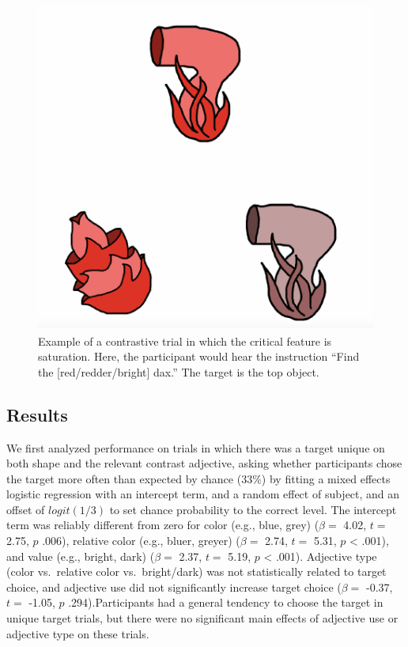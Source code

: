\documentclass[10pt, letterpaper]{article}
\newenvironment{CodeChunk}{}{}
\begin{document}
\begin{CodeChunk}
\begin{figure}[H]

{\centering \includegraphics{figs/brightdarktrial-1} 

}

\caption[Example of a contrastive trial in which the critical feature is saturation]{Example of a contrastive trial in which the critical feature is saturation. Here, the participant would hear the instruction ``Find the [red/redder/bright] dax.'' The target is the top object.}\label{fig:brightdarktrial}
\end{figure}
\end{CodeChunk}

\subsection{Results}\label{results-1}

We first analyzed performance on trials in which there was a target
unique on both shape and the relevant contrast adjective, asking whether
participants chose the target more often than expected by chance
(\(33\%\)) by fitting a mixed effects logistic regression with an
intercept term, and a random effect of subject, and an offset of
\(logit(1/3)\) to set chance probability to the correct level. The
intercept term was reliably different from zero for color (e.g., blue,
grey) (\(\beta =\) 4.02, \(t =\) 2.75, \(p\) .006), relative color
(e.g., bluer, greyer) (\(\beta =\) 2.74, \(t =\) 5.31, \(p\) \textless{}
.001), and value (e.g., bright, dark) (\(\beta =\) 2.37, \(t =\) 5.19,
\(p\) \textless{} .001). Adjective type (color vs.~relative color
vs.~bright/dark) was not statistically related to target choice, and
adjective use did not significantly increase target choice (\(\beta =\)
-0.37, \(t =\) -1.05, \(p\) .294).Participants had a general tendency to
choose the target in unique target trials, but there were no significant
main effects of adjective use or adjective type on these trials.
\end{document}
